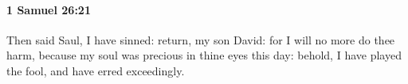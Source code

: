
		\paragraph{1 Samuel 26:21} %
			\label{1SAMUEL-26-21}

			Then said Saul, I have sinned: return, my son David: for I will no more do thee harm, because my soul was precious in thine eyes this day: behold, I have played the fool, and have erred exceedingly.


